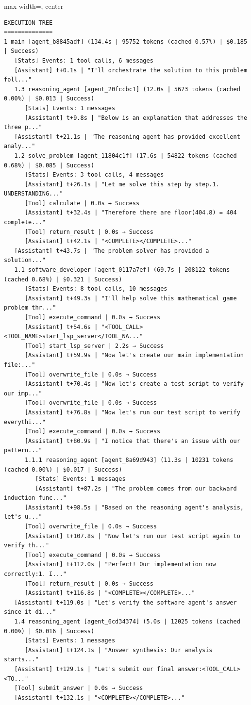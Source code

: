 {
\begin{adjustbox}{max width=\linewidth, center}
\begin{tracebox}
\begin{verbatim}
EXECUTION TREE
==============
1 main [agent_b8845adf] (134.4s | 95752 tokens (cached 0.57%) | $0.185 | Success)
   [Stats] Events: 1 tool calls, 6 messages
   [Assistant] t+0.1s | "I'll orchestrate the solution to this problem foll..."
   1.3 reasoning_agent [agent_20fccbc1] (12.0s | 5673 tokens (cached 0.00%) | $0.013 | Success)
      [Stats] Events: 1 messages
      [Assistant] t+9.8s | "Below is an explanation that addresses the three p..."
   [Assistant] t+21.1s | "The reasoning agent has provided excellent analy..."
   1.2 solve_problem [agent_11804c1f] (17.6s | 54822 tokens (cached 0.68%) | $0.085 | Success)
      [Stats] Events: 3 tool calls, 4 messages
      [Assistant] t+26.1s | "Let me solve this step by step.1. UNDERSTANDING..."
      [Tool] calculate | 0.0s → Success
      [Assistant] t+32.4s | "Therefore there are floor(404.8) = 404 complete..."
      [Tool] return_result | 0.0s → Success
      [Assistant] t+42.1s | "<COMPLETE></COMPLETE>..."
   [Assistant] t+43.7s | "The problem solver has provided a solution..."
   1.1 software_developer [agent_0117a7ef] (69.7s | 208122 tokens (cached 0.68%) | $0.321 | Success)
      [Stats] Events: 8 tool calls, 10 messages
      [Assistant] t+49.3s | "I'll help solve this mathematical game problem thr..."
      [Tool] execute_command | 0.0s → Success
      [Assistant] t+54.6s | "<TOOL_CALL><TOOL_NAME>start_lsp_server</TOOL_NA..."
      [Tool] start_lsp_server | 2.2s → Success
      [Assistant] t+59.9s | "Now let's create our main implementation file:..."
      [Tool] overwrite_file | 0.0s → Success
      [Assistant] t+70.4s | "Now let's create a test script to verify our imp..."
      [Tool] overwrite_file | 0.0s → Success
      [Assistant] t+76.8s | "Now let's run our test script to verify everythi..."
      [Tool] execute_command | 0.0s → Success
      [Assistant] t+80.9s | "I notice that there's an issue with our pattern..."
      1.1.1 reasoning_agent [agent_8a69d943] (11.3s | 10231 tokens (cached 0.00%) | $0.017 | Success)
         [Stats] Events: 1 messages
         [Assistant] t+87.2s | "The problem comes from our backward induction func..."
      [Assistant] t+98.5s | "Based on the reasoning agent's analysis, let's u..."
      [Tool] overwrite_file | 0.0s → Success
      [Assistant] t+107.8s | "Now let's run our test script again to verify th..."
      [Tool] execute_command | 0.0s → Success
      [Assistant] t+112.0s | "Perfect! Our implementation now correctly:1. I..."
      [Tool] return_result | 0.0s → Success
      [Assistant] t+116.8s | "<COMPLETE></COMPLETE>..."
   [Assistant] t+119.0s | "Let's verify the software agent's answer since it di..."
   1.4 reasoning_agent [agent_6cd34374] (5.0s | 12025 tokens (cached 0.00%) | $0.016 | Success)
      [Stats] Events: 1 messages
      [Assistant] t+124.1s | "Answer synthesis: Our analysis starts..."
   [Assistant] t+129.1s | "Let's submit our final answer:<TOOL_CALL><TO..."
   [Tool] submit_answer | 0.0s → Success
   [Assistant] t+132.1s | "<COMPLETE></COMPLETE>..."


\end{verbatim}
\end{tracebox}
\end{adjustbox}}
